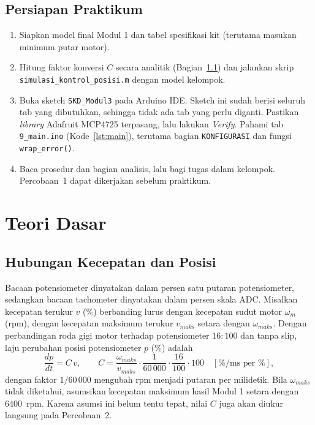 \documentclass[11pt,a4paper]{article}
\newcommand{\prog}[1]{\texttt{#1}}
\begin{document}
\subsection{Persiapan Praktikum}
\begin{enumerate}
\item Siapkan model final Modul 1 dan tabel spesifikasi kit (terutama masukan minimum putar motor).
\item Hitung faktor konversi $C$ secara analitik (Bagian~\ref{sec:model_posisi}) dan jalankan skrip \prog{simulasi\_kontrol\_posisi.m} dengan model kelompok.
\item Buka sketch \prog{SKD\_Modul3} pada Arduino IDE. Sketch ini sudah berisi seluruh tab yang dibutuhkan, sehingga tidak ada tab yang perlu diganti. Pastikan \textit{library} Adafruit MCP4725 terpasang, lalu lakukan \textit{Verify}. Pahami tab \prog{9\_main.ino} (Kode~\ref{lst:main}), terutama bagian \texttt{KONFIGURASI} dan fungsi \texttt{wrap\_error()}.
\item Baca prosedur dan bagian analisis, lalu bagi tugas dalam kelompok. Percobaan~1 dapat dikerjakan sebelum praktikum.
\end{enumerate}

\section{Teori Dasar}
\subsection{Hubungan Kecepatan dan Posisi}
\label{sec:model_posisi}
Bacaan potensiometer dinyatakan dalam persen satu putaran potensiometer, sedangkan bacaan tachometer dinyatakan dalam persen skala ADC. Misalkan kecepatan terukur $v$ (\%) berbanding lurus dengan kecepatan sudut motor $\omega_m$ (rpm), dengan kecepatan maksimum terukur $v_{maks}$ setara dengan $\omega_{maks}$. Dengan perbandingan roda gigi motor terhadap potensiometer $16:100$ dan tanpa slip, laju perubahan posisi potensiometer $p$ (\%) adalah
\begin{equation}
\frac{dp}{dt} = C\,v,
\qquad
C = \frac{\omega_{maks}}{v_{maks}} \cdot \frac{1}{60\,000} \cdot \frac{16}{100} \cdot 100\quad [\%/\text{ms per } \%],
\label{eq:konversi}
\end{equation}
dengan faktor $1/60\,000$ mengubah rpm menjadi putaran per milidetik. Bila $\omega_{maks}$ tidak diketahui, asumsikan kecepatan maksimum hasil Modul 1 setara dengan 6400~rpm. Karena asumsi ini belum tentu tepat, nilai $C$ juga akan diukur langsung pada Percobaan~2.
\end{document}
